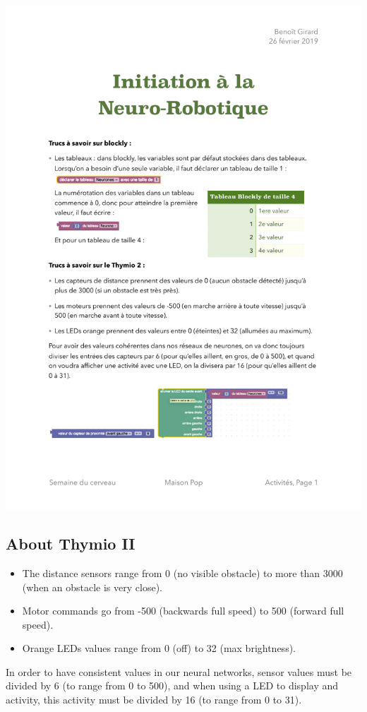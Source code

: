 \documentclass[12pt]{article}
\begin{document}
\includegraphics{../StructureTableau.pdf}

\subsection*{About Thymio II}
\begin{itemize}
    \item The distance sensors range from 0 (no visible obstacle) to more than 3000 (when an obstacle is very close).
    \item Motor commands go from -500 (backwards full speed) to 500 (forward full speed).
    \item Orange LEDs values range from 0 (off) to 32 (max brightness).
\end{itemize}

In order to have consistent values in our neural networks, sensor values must be divided by 6 (to range from 0 to 500), and when using a LED to display and activity, this activity must be divided by 16 (to range from 0 to 31).
\end{document}
